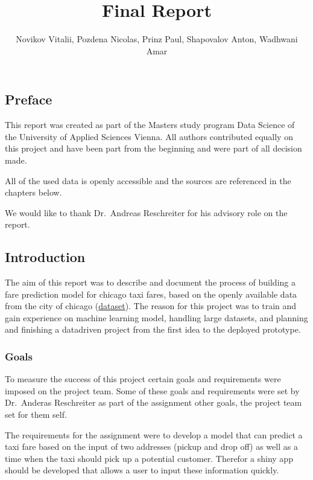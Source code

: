 \documentclass[
  letterpaper,
  DIV=11,
  numbers=noendperiod]{scrartcl}
\title{Final Report}
\author{Novikov Vitalii, Pozdena Nicolas, Prinz Paul, Shapovalov Anton,
Wadhwani Amar}
\date{}
\begin{document}
\maketitle


\newpage

\subsection{Preface}\label{preface}

This report was created as part of the Masters study program Data
Science of the University of Applied Sciences Vienna. All authors
contributed equally on this project and have been part from the
beginning and were part of all decision made.

All of the used data is openly accessible and the sources are referenced
in the chapters below.

We would like to thank Dr.~Andreas Reschreiter for his advisory role on
the report.

\newpage

\subsection{Introduction}\label{introduction}

The aim of this report was to describe and document the process of
building a fare prediction model for chicago taxi fares, based on the
openly available data from the city of chicago
(\href{https://data.cityofchicago.org/Transportation/Taxi-Trips-2013-2023-/wrvz-psew/about_data}{dataset}).
The reason for this project was to train and gain experience on machine
learning model, handling large datasets, and planning and finishing a
datadriven project from the first idea to the deployed prototype.

\subsubsection{Goals}\label{goals}

To measure the success of this project certain goals and requirements
were imposed on the project team. Some of these goals and requirements
were set by Dr.~Anderas Reschreiter as part of the assignment other
goals, the project team set for them self.

The requirements for the assignment were to develop a model that can
predict a taxi fare based on the input of two addresses (pickup and drop
off) as well as a time when the taxi should pick up a potential
customer. Therefor a shiny app should be developed that allows a user to
input these information quickly.
\end{document}
